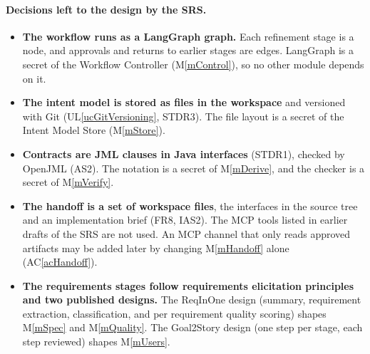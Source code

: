 \documentclass[12pt, titlepage]{article}
\newcommand{\acref}[1]{AC\ref{#1}}
\newcommand{\uref}[1]{UL\ref{#1}}
\newcommand{\mref}[1]{M\ref{#1}}
\begin{document}
\paragraph{Decisions left to the design by the SRS.}
\begin{itemize}
  \item \textbf{The workflow runs as a LangGraph graph.} Each refinement stage
  is a node, and approvals and returns to earlier stages are edges. LangGraph is
  a secret of the Workflow Controller (\mref{mControl}), so no other module
  depends on it.
  \item \textbf{The intent model is stored as files in the workspace} and
  versioned with Git (\uref{ucGitVersioning}, STDR3). The file layout is a
  secret of the Intent Model Store (\mref{mStore}).
  \item \textbf{Contracts are JML clauses in Java interfaces} (STDR1), checked
  by OpenJML (AS2). The notation is a secret of \mref{mDerive}, and the
  checker is a secret of \mref{mVerify}.
  \item \textbf{The handoff is a set of workspace files}, the interfaces in the
  source tree and an implementation brief (FR8, IAS2). The MCP tools listed in
  earlier drafts of the SRS are not used. An MCP channel that only reads
  approved artifacts may be added later by changing \mref{mHandoff} alone
  (\acref{acHandoff}).
  \item \textbf{The requirements stages follow requirements elicitation
  principles and two published designs.} The ReqInOne design (summary, requirement extraction,
  classification, and per requirement quality scoring) shapes
  \mref{mSpec} and \mref{mQuality}. The Goal2Story design (one step per stage,
  each step reviewed) shapes \mref{mUsers}.
\end{itemize}
\end{document}
